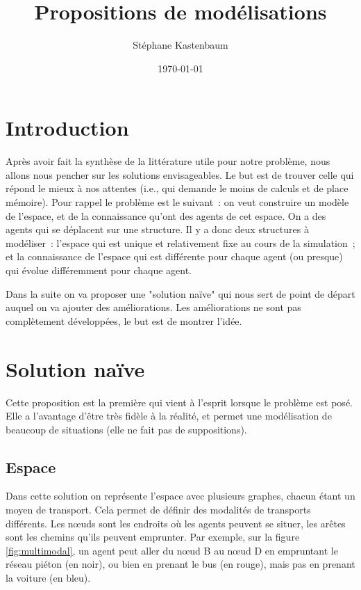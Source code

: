 \documentclass[a4paper]{article}
\title{Propositions de modélisations}
\author{Stéphane Kastenbaum}
\date{\today}
\begin{document}
\maketitle

\section{Introduction}

Après avoir fait la synthèse de la littérature utile pour notre problème, nous
allons nous pencher sur les solutions envisageables. Le but est de trouver celle
qui répond le mieux à nos attentes (i.e., qui demande le moins de calculs et de
place mémoire). Pour rappel le problème est le suivant~: on veut construire un
modèle de l'espace, et de la connaissance qu'ont des agents de cet espace. On a
des agents qui se déplacent sur une structure. Il y a donc deux structures à
modéliser~: l'espace qui est unique et relativement fixe au cours de la
simulation~; et la connaissance de l'espace qui est différente pour chaque
agent (ou presque) qui évolue différemment pour chaque agent.

Dans la suite on va proposer une "solution naïve" qui nous sert de point de
départ auquel on va ajouter des améliorations. Les améliorations ne sont pas
complètement développées, le but est de montrer l'idée.

\section{Solution naïve}
\label{sec:naive}

Cette proposition est la première qui vient à l'esprit lorsque le problème est
posé. Elle a l'avantage d'être très fidèle à la réalité, et permet une
modélisation de beaucoup de situations (elle ne fait pas de suppositions).


  \subsection{Espace}

Dans cette solution on représente l'espace avec plusieurs graphes, chacun étant
un moyen de transport. Cela permet de définir des modalités de transports
différents. Les nœuds sont les endroits où les agents peuvent se situer, les
arêtes sont les chemins qu'ils peuvent emprunter. Par exemple, sur la figure
\ref{fig:multimodal}, un agent peut aller du nœud B au nœud D en empruntant le
réseau piéton (en noir), ou bien en prenant le bus (en rouge), mais pas en
prenant la voiture (en bleu).
\end{document}
